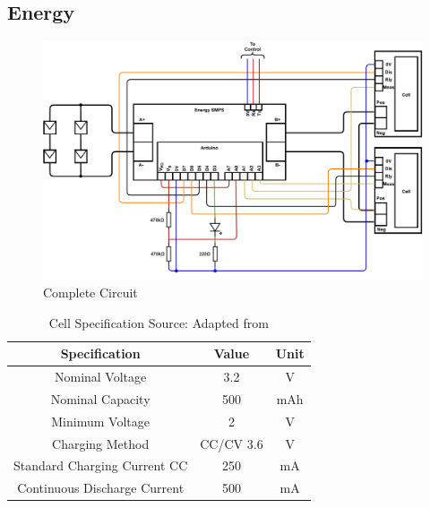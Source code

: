 \documentclass[10pt,twoside]{article}
\begin{document}
\newpage
\begin{appendices}

\section{Energy}

\setcounter{figure}{0}  %
\setcounter{table}{0}   %

\begin{figure}[htb]
    \centering
    \includegraphics[width = \textwidth]{FinalCircuit.pdf}
    \caption{Complete Circuit}
    \label{fig:FinalCircuit}
\end{figure}

\begin{table}[htb]
    \centering
    \renewcommand{\arraystretch}{1.3}
    \begin{tabular}{||c|c|c||}
    \hline
    Specification & Value & Unit \\ [0.5ex]
    \hline \hline
    Nominal Voltage    & 3.2 & V\\
    Nominal Capacity     & 500 & mAh\\
    Minimum Voltage         & 2  & V\\
    Charging Method     & CC/CV 3.6  & V\\
    Standard Charging Current CC    & 250  & mA\\
    Continuous Discharge Current   & 500  &   mA\\
    \hline
    \end{tabular}
    \caption{Cell Specification \quad Source: Adapted from \cite{AmpsplusBattery}}
    \label{fig:CellSpecification}
\end{table}
\label{appendix:Energy}


\end{appendices}
\end{document}
